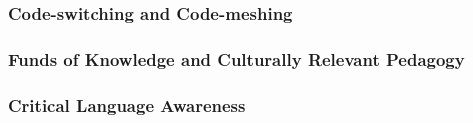 \textcolor{red}{
  \blindtext[1]
}


\subsubsection{Code-switching and Code-meshing}\label{subsubsec:code-switching-and-code-meshing}

\textcolor{red}{
  \blindtext[1]
}

\subsubsection{Funds of Knowledge and Culturally Relevant Pedagogy}\label{subsubsec:funds-of-knowledge}

\textcolor{red}{
  \blindtext[1]
}

\textcolor{red}{
  \blindtext[1]
}

\subsubsection{Critical Language Awareness}\label{subsubsec:critical-language-awareness}

\textcolor{red}{
  \blindtext[1]
}


